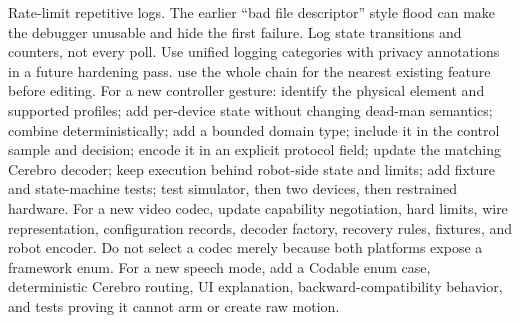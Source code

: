 {}Rate-limit repetitive logs. The earlier “bad file descriptor” style flood can make the debugger unusable and hide the first failure. Log state transitions and counters, not every poll. Use unified logging categories with privacy annotations in a future hardening pass.\markdownRendererInterblockSeparator
{}
\markdownRendererSectionEnd \markdownRendererSectionBegin
{}\markdownRendererInterblockSeparator
{}\markdownRendererBlockQuoteBegin
{} use the whole chain for the nearest existing feature before editing.\markdownRendererBlockQuoteEnd \markdownRendererInterblockSeparator
{}For a new controller gesture:\markdownRendererInterblockSeparator
{}\markdownRendererOlBegin
{}identify the physical element and supported profiles;\markdownRendererOlItemEnd 
{}add per-device state without changing dead-man semantics;\markdownRendererOlItemEnd 
{}combine deterministically;\markdownRendererOlItemEnd 
{}add a bounded domain type;\markdownRendererOlItemEnd 
{}include it in the control sample and decision;\markdownRendererOlItemEnd 
{}encode it in an explicit protocol field;\markdownRendererOlItemEnd 
{}update the matching Cerebro decoder;\markdownRendererOlItemEnd 
{}keep execution behind robot-side state and limits;\markdownRendererOlItemEnd 
{}add fixture and state-machine tests;\markdownRendererOlItemEnd 
{}test simulator, then two devices, then restrained hardware.\markdownRendererOlItemEnd 
\markdownRendererOlEnd \markdownRendererInterblockSeparator
{}For a new video codec, update capability negotiation, hard limits, wire representation, configuration records, decoder factory, recovery rules, fixtures, and robot encoder. Do not select a codec merely because both platforms expose a framework enum.\markdownRendererParagraphSeparator
{}For a new speech mode, add a Codable enum case, deterministic Cerebro routing, UI explanation, backward-compatibility behavior, and tests proving it cannot arm or create raw motion.\markdownRendererInterblockSeparator
{}
\markdownRendererSectionEnd \markdownRendererSectionBegin
{}\markdownRendererInterblockSeparator
